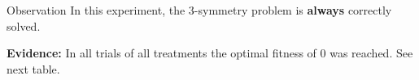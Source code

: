 \begin{frame}
\vspace*{2mm}
\begin{block}{
Observation
}
In this experiment, the 3-symmetry problem is {\bf always} correctly solved.
 
{\bf Evidence:}
In all trials of all treatments the optimal fitness of $0$ was reached.
See next table.
\end{block}
\end{frame}
